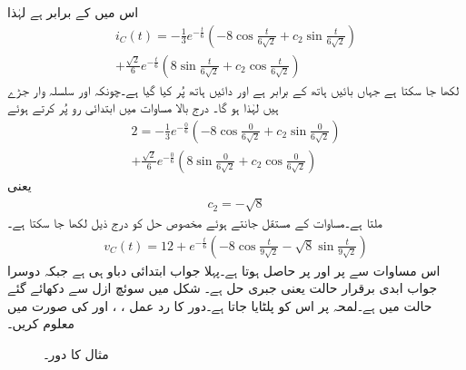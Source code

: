 اس میں  کے برابر ہے لہٰذا
\begin{multline*}
i_C(t)=-\frac{1}{3}e^{-\frac{t}{6}}\left(-8 \cos \frac{t}{6\sqrt{2}}+c_2 \sin \frac{t}{6\sqrt{2}}\right)\\+\frac{\sqrt{2}}{6}e^{-\frac{t}{6}}\left(8 \sin \frac{t}{6\sqrt{2}}+c_2 \cos \frac{t}{6\sqrt{2}}\right)
\end{multline*}
لکھا جا سکتا ہے جہاں بائیں ہاتھ  کے برابر ہے اور دائیں ہاتھ  پُر کیا گیا ہے۔چونکہ  اور  سلسلہ وار جڑے ہیں لہٰذا  ہو گا۔ درج بالا مساوات میں ابتدائی رو  پُر کرتے ہوئے
\begin{multline*}
2=-\frac{1}{3}e^{-\frac{0}{6}}\left(-8 \cos \frac{0}{6\sqrt{2}}+c_2 \sin \frac{0}{6\sqrt{2}}\right)\\
+\frac{\sqrt{2}}{6}e^{-\frac{0}{6}}\left(8 \sin \frac{0}{6\sqrt{2}}+c_2 \cos \frac{0}{6\sqrt{2}}\right)
\end{multline*}
یعنی
\begin{align*}
c_2=-\sqrt{8}
\end{align*}
ملتا ہے۔مساوات کے مستقل جانتے ہوئے مخصوص حل کو درج ذیل لکھا جا سکتا ہے۔
\begin{align}
v_C(t)=12+e^{-\frac{t}{6}}\left(-8\cos \frac{t}{9\sqrt{2}}-\sqrt{8}\sin \frac{t}{9\sqrt{2}} \right)
\end{align}
اس مساوات سے  پر  اور  پر  حاصل ہوتا ہے۔پہلا جواب ابتدائی دباو ہی ہے جبکہ دوسرا جواب ابدی برقرار حالت یعنی جبری حل ہے۔ 
شکل  میں سوئچ ازل سے دکھائے گئے حالت میں ہے۔لمحہ  پر اس کو پلٹایا جاتا ہے۔دور کا رد عمل ، ،  اور  کی صورت میں معلوم کریں۔
\begin{figure}
\centering
{}
\caption{مثال  کا دور۔}
\label{شکل_عارضی_مستطیل_دباو_ب}
\end{figure}

